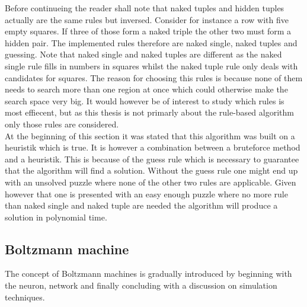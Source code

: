 \documentclass[a4paper,11pt]{kth-mag}
\begin{document}
Before continueing the reader shall note that naked tuples and hidden tuples actually are the same rules but inversed.
Consider for instance a row with five empty squares.
If three of those form a naked triple the other two must form a hidden pair.
The implemented rules therefore are naked single, naked tuples and guessing.
Note that naked single and naked tuples are different as the naked single rule fills in numbers in squares whilst the naked tuple rule only deals with candidates for squares.
The reason for choosing this rules is because none of them needs to search more than one region at once which could otherwise make the search space very big. It would however be of interest to study which rules is most effiecent, but as this thesis is not primarly about the rule-based algorithm only those rules are considered.
\\
At the beginning of this section it was stated that this algorithm was built on a heuristik which is true.
It is however a combination between a bruteforce method and a heuristik.
This is because of the guess rule which is necessary to guarantee that the algorithm will find a solution.
Without the guess rule one might end up with an unsolved puzzle where none of the other two rules are applicable.
Given however that one is presented with an easy enough puzzle where no more rule than naked single and naked tuple are needed the algorithm will produce a solution in polynomial time.

\FloatBarrier
\subsection{Boltzmann machine}
The concept of Boltzmann machines is gradually introduced by beginning with the neuron, network and finally concluding with a discussion on simulation techniques.\\
\end{document}
